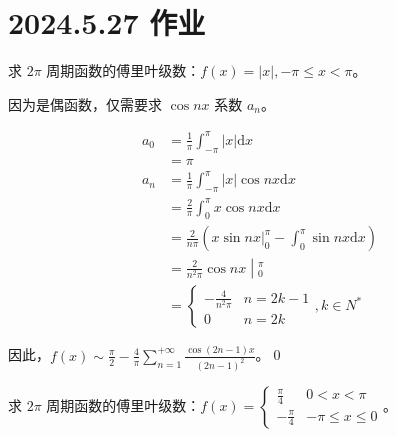 \ifx\allfiles\undefined

\date{}
\author{尹锦润}

\maketitle
\fi

\section{2024.5.27 作业}

\begin{ques}
	求 $\displaystyle 2\pi $ 周期函数的傅里叶级数：$\displaystyle f( x) =|x|,-\pi \leqslant x< \pi $。
\end{ques}



因为是偶函数，仅需要求 $\displaystyle \cos nx$ 系数 $\displaystyle a_{n}$。


\begin{align*}
	a_{0} & =\frac{1}{\pi }\int _{-\pi }^{\pi } |x|\mathrm{d} x\\
	& =\pi \\
	a_{n} & =\frac{1}{\pi }\int _{-\pi }^{\pi } |x|\cos nx\mathrm{d} x\\
	& =\frac{2}{\pi }\int _{0}^{\pi } x\cos nx\mathrm{d} x\\
	& =\frac{2}{n\pi }\left( x\sin nx| _{0}^{\pi } -\int _{0}^{\pi }\sin nx\mathrm{d} x\right)\\
	& =\left. \frac{2}{n^{2} \pi }\cos nx\middle| _{0}^{\pi }\right. \\
	& =\begin{cases}
		-\frac{4}{n^{2} \pi } & n=2k-1\\
		0 & n=2k
	\end{cases} ,k\in N^{*}
\end{align*}

因此，$\displaystyle f( x) \sim \frac{\pi }{2} -\frac{4}{\pi }\sum _{n=1}^{+\infty }\frac{\cos( 2n-1) x}{( 2n-1)^{2}}$。\qed 



\begin{ques}
	求 $\displaystyle 2\pi $ 周期函数的傅里叶级数：$\displaystyle f( x) =\begin{cases}
	\frac{\pi }{4} & 0< x< \pi \\
	-\frac{\pi }{4} & -\pi \leqslant x\leqslant 0
\end{cases}$。
\end{ques}



